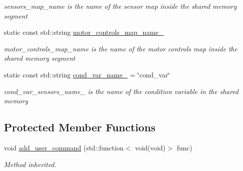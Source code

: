 \begin{DoxyCompactItemize}
\begin{DoxyCompactList}\small\item\em sensors\+\_\+map\+\_\+name is the name of the sensor map inside the shared memory segment \end{DoxyCompactList}\item 
static const std\+::string \hyperlink{classdynamic__graph_1_1DynamicGraphManager_a056de4d7a49496b2b0812d96d93370d9}{motor\+\_\+controls\+\_\+map\+\_\+name\+\_\+}
\begin{DoxyCompactList}\small\item\em motor\+\_\+controls\+\_\+map\+\_\+name is the name of the motor controls map inside the shared memory segment \end{DoxyCompactList}\item 
static const std\+::string \hyperlink{classdynamic__graph_1_1DynamicGraphManager_a909b8d2d024a2a11473fa2d94a18002e}{cond\+\_\+var\+\_\+name\+\_\+} = \char`\"{}cond\+\_\+var\char`\"{}\hypertarget{classdynamic__graph_1_1DynamicGraphManager_a909b8d2d024a2a11473fa2d94a18002e}{}\label{classdynamic__graph_1_1DynamicGraphManager_a909b8d2d024a2a11473fa2d94a18002e}

\begin{DoxyCompactList}\small\item\em cond\+\_\+var\+\_\+sensors\+\_\+name\+\_\+ is the name of the condition variable in the shared memory \end{DoxyCompactList}\end{DoxyCompactItemize}
\subsection*{Protected Member Functions}
\begin{DoxyCompactItemize}
\item 
void \hyperlink{classdynamic__graph_1_1DynamicGraphManager_a72146c4ddd173869a512e9f174ad48df}{add\+\_\+user\+\_\+command} (std\+::function$<$ void(void)$>$ func)
\begin{DoxyCompactList}\small\item\em Method inherited. \end{DoxyCompactList}\end{DoxyCompactItemize}
